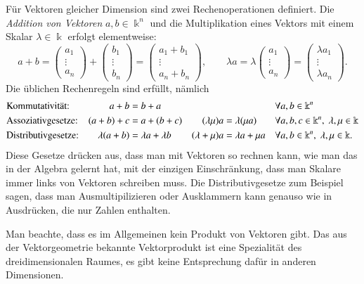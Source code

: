 Für Vektoren gleicher Dimension sind zwei Rechenoperationen definiert.
Die {\em Addition von Vektoren} $a,b\in\Bbbk^n$  und die Multiplikation
%
eines Vektors mit einem Skalar $\lambda\in\Bbbk$ erfolgt elementweise:
\[
a+b
=
\begin{pmatrix}a_1\\\vdots\\a_n\end{pmatrix}
+
\begin{pmatrix}b_1\\\vdots\\b_n\end{pmatrix}
=
\begin{pmatrix}a_1+b_1\\\vdots\\a_n+b_n\end{pmatrix},
\qquad
\lambda a
=
\lambda
\begin{pmatrix}a_1\\\vdots\\a_n\end{pmatrix}
=
\begin{pmatrix}\lambda a_1\\\vdots\\\lambda a_n\end{pmatrix}.
\]
Die üblichen Rechenregeln sind erfüllt, nämlich
\begin{equation}
\index{Kommutativgesetz}%
\index{Assoziativgesetz}%
\index{Distributivgesetz}%
\begin{aligned}
&\text{Kommutativität:}
&
a+b&=b+a
&&
&&\forall a,b\in \Bbbk^n
\\
&\text{Assoziativgesetze:}
&
(a+b)+c&=a+(b+c)
&
(\lambda\mu)a&=\lambda(\mu a)
&&\forall a,b,c\in \Bbbk^n,\; \lambda,\mu\in\Bbbk
\\
&\text{Distributivgesetze:}
&
\lambda(a+b)&=\lambda a + \lambda b
&
(\lambda+\mu)a&=\lambda a + \mu a
&&\forall a,b\in \Bbbk^n,\; \lambda,\mu\in\Bbbk.
\end{aligned}
\label{buch:vektoren-und-matrizen:eqn:vrgesetze}
\end{equation}
Diese Gesetze drücken aus, dass man mit Vektoren so rechnen kann, wie man
das in der Algebra gelernt hat, mit der einzigen Einschränkung, dass
man Skalare immer links von Vektoren schreiben muss.
Die Distributivgesetze zum Beispiel sagen, dass man Ausmultipilizieren
oder Ausklammern kann genauso wie in Ausdrücken, die nur Zahlen enthalten.

Man beachte, dass es im Allgemeinen kein Produkt von Vektoren gibt.
Das aus der Vektorgeometrie bekannte Vektorprodukt ist eine Spezialität
des dreidimensionalen Raumes, es gibt keine Entsprechung dafür in anderen
Dimensionen.

